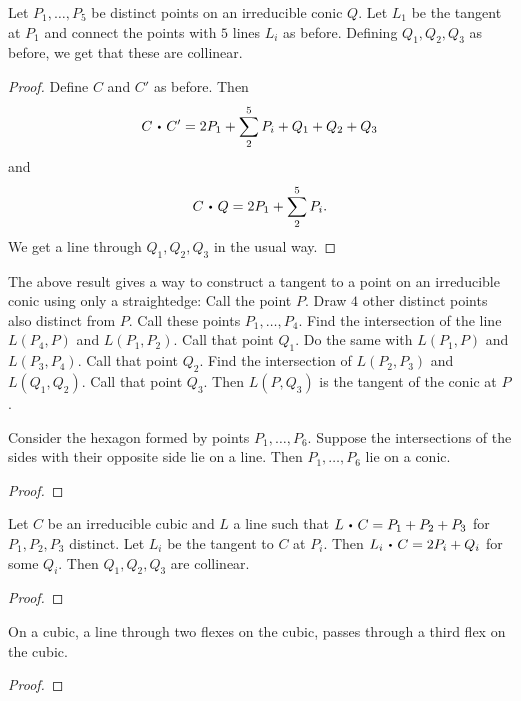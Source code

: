     \begin{proposition}
        Let $P_1,\dots,P_5$ be distinct points on an irreducible conic $Q$. Let $L_1$ be the tangent at $P_1$ and connect the points with $5$ lines $L_i$ as before. Defining $Q_1,Q_2,Q_3$ as before, we get that these are collinear. 
    \end{proposition}
    \begin{proof}
        Define $C$ and $C'$ as before. Then 
        $$C\ic C' = 2P_1 + \sum_2^5 P_i+ Q_1+Q_2+Q_3$$
        and 
        $$C\ic Q= 2P_1 + \sum_2^5 P_i.$$
        We get a line through $Q_1,Q_2,Q_3$ in the usual way. 
    \end{proof}
    \begin{remark}
        The above result gives a way to construct a tangent to a point on an irreducible conic using only a straightedge: Call the point $P$. Draw $4$ other distinct points also distinct from $P$. Call these points $P_1,\dots,P_4$. Find the intersection of the line $L(P_4,P)$ and $L(P_1,P_2)$. Call that point $Q_1$. Do the same with $L(P_1,P)$ and $L(P_3,P_4)$. Call that point $Q_2$. Find the intersection of $L(P_2,P_3)$ and $L(Q_1,Q_2)$. Call that point $Q_3$. Then $L(P,Q_3)$ is the tangent of the conic at $P$. 
    \end{remark}
    \begin{proposition}
        Consider the hexagon formed by points $P_1,\dots,P_6$. Suppose the intersections of the sides with their opposite side lie on a line.  Then $P_1,\dots, P_6$ lie on a conic.  
    \end{proposition}
    \begin{proof}
        
    \end{proof}
    \begin{proposition}
        Let $C$ be an irreducible cubic and $L$ a line such that $L\ic C = P_1+P_2+P_3$ for $P_1,P_2,P_3$ distinct. Let $L_i$ be the tangent to $C$ at $P_i$. Then $L_i\ic C= 2P_i+Q_i$ for some $Q_i$. Then $Q_1,Q_2,Q_3$ are collinear. 
    \end{proposition}
    \begin{proof}
        
    \end{proof}
    \begin{proposition}
        On a cubic, a line through two flexes on the cubic, passes through a third flex on the cubic.
    \end{proposition}
    \begin{proof}
        
    \end{proof}